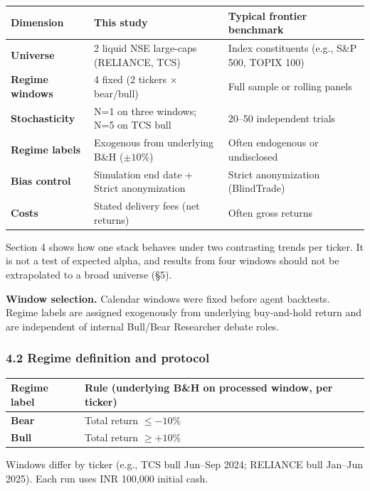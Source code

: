 \documentclass{article}
\begin{document}
\begin{tabularx}{\linewidth}{@{} l X X @{}}
\toprule
Dimension & This study & Typical frontier benchmark \\
\midrule
\textbf{Universe} &
  2 liquid NSE large-caps (RELIANCE, TCS) &
  Index constituents (e.g., S\&P 500, TOPIX 100) \\
\addlinespace
\textbf{Regime windows} &
  4 fixed (2 tickers $\times$ bear/bull) &
  Full sample or rolling panels \\
\addlinespace
\textbf{Stochasticity} &
  N=1 on three windows; N=5 on TCS bull &
  20--50 independent trials \\
\addlinespace
\textbf{Regime labels} &
  Exogenous from underlying B\&H ($\pm 10\%$) &
  Often endogenous or undisclosed \\
\addlinespace
\textbf{Bias control} &
  Simulation end date + Strict anonymization &
  Strict anonymization (BlindTrade) \\
\addlinespace
\textbf{Costs} &
  Stated delivery fees (net returns) &
  Often gross returns \\
\bottomrule
\end{tabularx}

Section 4 shows how one stack behaves under two contrasting trends per
ticker. It is not a test of expected alpha, and results from four
windows should not be extrapolated to a broad universe (§5).

\textbf{Window selection.} Calendar windows were fixed before agent
backtests.
Regime labels are assigned exogenously from underlying
buy-and-hold return and are independent of internal Bull/Bear
Researcher debate roles.

\subsubsection{4.2 Regime definition and
protocol}\label{regime-definition-and-protocol}

\begin{tabular}{@{} l l @{}}
\toprule
Regime label & Rule (underlying B\&H on processed window, per ticker) \\
\midrule
\textbf{Bear} & Total return $\leq -10\%$ \\
\textbf{Bull} & Total return $\geq +10\%$ \\
\bottomrule
\end{tabular}

Windows differ by ticker (e.g., TCS bull Jun--Sep 2024;
RELIANCE bull Jan--Jun 2025). Each run uses INR 100,000 initial cash.
\end{document}

